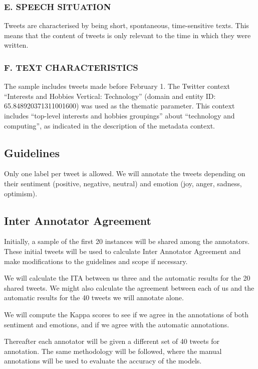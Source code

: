 \documentclass[11pt,a4paper]{article}
\begin{document}
\subsubsection*{E. SPEECH SITUATION}
Tweets are characterised by being short, spontaneous, time-sensitive texts. This means that the content of tweets is only relevant to the time in which they were written.

\subsubsection*{F. TEXT CHARACTERISTICS}
The sample includes tweets made before February 1. The Twitter context “Interests and Hobbies Vertical: Technology'' (domain and entity ID: 65.848920371311001600) was used as the thematic parameter. This context includes “top-level interests and hobbies groupings” about “technology and computing”, as indicated in the description of the metadata context.

\subsection{Guidelines}

Only one label per tweet is allowed. We will annotate the tweets depending on their sentiment (positive, negative, neutral) and emotion (joy, anger, sadness, optimism).

\subsection{Inter Annotator Agreement}

Initially, a sample of the first 20 instances will be shared among the annotators. These initial tweets will be used to calculate Inter Annotator Agreement and make modifications to the guidelines and scope if necessary. 

We will calculate the ITA between us three and the automatic results for the 20 shared tweets. We might also calculate the agreement between each of us and the automatic results for the 40 tweets we will annotate alone.

We will compute the Kappa scores to see if we agree in the annotations of both sentiment and emotions, and if we agree with the automatic annotations.

Thereafter each annotator will be given a different set of 40 tweets for annotation. The same methodology will be followed, where the manual annotations will be used to evaluate the accuracy of the models.
\end{document}
